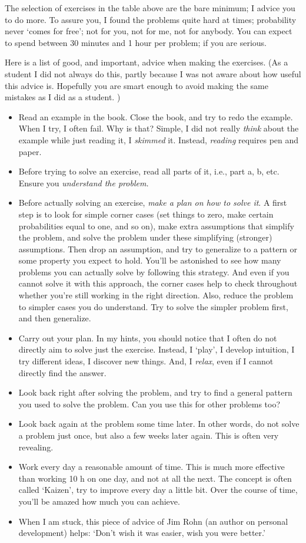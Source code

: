 \documentclass[a4paper]{article}
\theoremstyle{definition}
\newcommand{\1}[1]{\,I_{#1}} %
\begin{document}
The selection of exercises in the table above are the bare minimum; I advice you to do more.
To assure you, I found the problems quite hard at times; probability never `comes for free'; not for you, not for me, not for anybody.
You can expect to spend between 30 minutes and 1 hour per problem; if you are serious.



Here is a list of good, and important, advice when making the exercises.
(As a student I did not always do this, partly because I was not aware about how useful this advice is. Hopefully you are smart enough to avoid making the same mistakes as I did as a student.
)
\begin{itemize}
\item Read an example in the book. Close the book, and try to redo the example. When I try, I often fail. Why is that? Simple, I did not really \emph{think} about the example while just reading it, I \emph{skimmed} it.  Instead, \emph{reading} requires pen and paper.
\item Before trying to solve an exercise, read all parts of it, i.e., part a, b, etc. Ensure you \emph{understand the problem.}
\item Before actually solving  an exercise, \emph{make a plan on how to solve it}. A first step is to look for simple corner cases (set things to zero, make certain probabilities equal to one, and so on), make extra assumptions that simplify the problem, and solve the problem under these simplifying (stronger) assumptions. Then drop an assumption, and try to generalize to a pattern or some property you expect to hold. You'll be astonished to see how many problems you can actually solve by following this strategy. And even if you cannot solve it with this approach, the corner cases help to check throughout whether you're still working in the right direction. Also, reduce the problem to simpler cases you do understand. Try to solve the simpler problem first, and then generalize.
\item Carry out your plan. In my hints, you should notice that I often do not directly aim to solve just the exercise. Instead, I `play', I develop intuition, I try different ideas, I discover new things. And, I \emph{relax}, even if I cannot directly find the answer.
\item Look back right after solving the problem, and try to find a general pattern you used to solve the problem. Can you use this for other problems too?
\item Look back again at the problem some time later. In other words, do not solve  a problem just once, but also a few weeks later again. This is often very revealing.
\item Work every day a reasonable amount of time. This is much more effective than working 10 h on one day, and not at all the next. The concept is often called `Kaizen', try to improve every day a little bit. Over the course of time, you'll be amazed how much you can achieve.
\item When I am stuck, this piece of advice of Jim Rohn (an author on personal development) helps: `Don't wish it was easier, wish you were better.'
\end{itemize}
\end{document}
